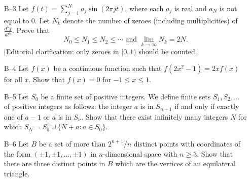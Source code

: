\documentclass[amssymb,twocolumn,pra,10pt,aps]{revtex4-1}
\begin{document}
\begin{itemize}
\item[B--3]
Let $f(t)=\sum_{j=1}^N a_j \sin(2\pi jt)$, where each $a_j$ is real
and
$a_N$ is not equal to 0.  Let $N_k$ denote the number of zeroes (including
multiplicities) of $\frac{d^k f}{dt^k}$.
Prove that
\[N_0\leq N_1\leq N_2\leq \cdots \mbox{ and } \lim_{k\to\infty} N_k =
2N.\]
[Editorial clarification: only zeroes in $[0, 1)$ should be counted.]

\item[B--4]
Let $f(x)$ be a continuous function such that $f(2x^2-1)=2xf(x)$ for
all $x$.  Show that $f(x)=0$ for $-1\leq x\leq 1$.

\item[B--5]
Let $S_0$ be a finite set of positive integers.  We define finite
sets
$S_1,S_2,\ldots$ of positive integers as follows:
the integer $a$ is in $S_{n+1}$ if and only if exactly one of $a-1$ or $a$ is
in
$S_n$.
Show that there exist infinitely many integers $N$ for which
$S_N=S_0\cup\{N+a: a\in S_0\}$.


\item[B--6]
Let $B$ be a set of more than $2^{n+1}/n$ distinct points with
coordinates
of the form $(\pm 1,\pm 1,\ldots,\pm 1)$ in $n$-dimensional space with
$n\geq 3$.
Show that there are three distinct points in $B$ which are the vertices of
an
equilateral triangle.

\end{itemize}
\end{document}
